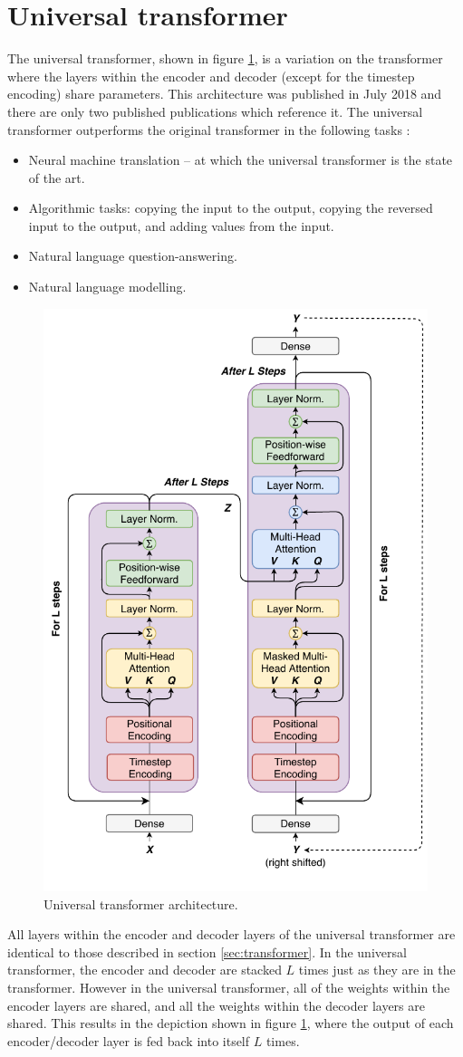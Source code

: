 \section{Universal transformer} \label{sec:universal_transformer}
The universal transformer, shown in figure \ref{fig:universal_transformer}, is a variation on the transformer where the layers within the encoder and decoder (except for the timestep encoding) share parameters.
This architecture was published in July 2018 \cite{Dehghani2018} and there are only two published publications which reference it.
The universal transformer outperforms the original transformer in the following tasks \cite{Dehghani2018}:
\begin{itemize}
	\item Neural machine translation -- at which the universal transformer is the state of the art.
	\item Algorithmic tasks: copying the input to the output, copying the reversed input to the output, and adding values from the input.
	\item Natural language question-answering.
	\item Natural language modelling.
\end{itemize}

\begin{figure}[htbp]
	\centerline{\includegraphics[width=.5\textwidth]{images/universal_transformer.pdf}}
	\caption{Universal transformer architecture.}
	\label{fig:universal_transformer}
\end{figure}

All layers within the encoder and decoder layers of the universal transformer are identical to those described in section \ref{sec:transformer}.
In the universal transformer, the encoder and decoder are stacked $L$ times just as they are in the transformer.
However in the universal transformer, all of the weights within the encoder layers are shared, and all the weights within the decoder layers are shared.
This results in the depiction shown in figure \ref{fig:universal_transformer}, where the output of each encoder/decoder layer is fed back into itself $L$ times.


